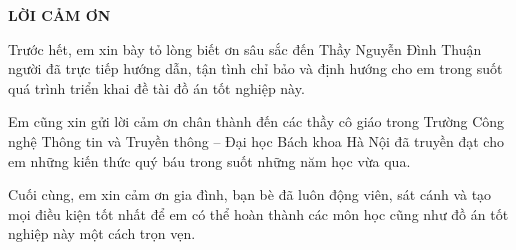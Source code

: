\documentclass[../DoAn.tex]{subfiles}
\begin{document}
\begin{center}
    {\bfseries\Large LỜI CẢM ƠN}
\end{center}
\vspace{1cm}

Trước hết, em xin bày tỏ lòng biết ơn sâu sắc đến Thầy Nguyễn Đình Thuận người đã trực tiếp hướng dẫn, tận tình chỉ bảo và định hướng cho em trong suốt quá trình triển khai đề tài đồ án tốt nghiệp này.

Em cũng xin gửi lời cảm ơn chân thành đến các thầy cô giáo trong Trường Công nghệ Thông tin và Truyền thông – Đại học Bách khoa Hà Nội đã truyền đạt cho em những kiến thức quý báu trong suốt những năm học vừa qua.

Cuối cùng, em xin cảm ơn gia đình, bạn bè đã luôn động viên, sát cánh và tạo mọi điều kiện tốt nhất để em có thể hoàn thành các môn học cũng như đồ án tốt nghiệp này một cách trọn vẹn.
\end{document}
